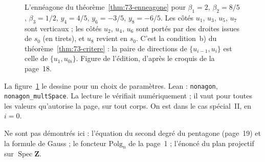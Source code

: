 \begin{figure}[htbp]
\centering
{}
\caption{L'ennéagone du théorème~\ref{thm:73-enneagone} pour $\beta_1 = 2$, $\beta_2 = 8/5$, $\beta_3 = 1/2$, $y_4 = 4/5$, $y_6 = -3/5$, $y_8 = -6/5$. Les côtés $u_1$, $u_3$, $u_5$, $u_7$ sont verticaux ; les côtés $u_2$, $u_4$, $u_6$ sont portés par des droites issues de $s_0$ (en tirets), et $u_8$ revient en $s_0$. C'est la condition~b) du théorème~\ref{thm:73-critere} : la paire de directions de $\{u_{i-1}, u_i\}$ est celle de $\{u_1, u_{0i}\}$. Figure de l'édition, d'après le croquis de la page~18.}
\label{fig:73-enneagone}
\end{figure}

La figure~\ref{fig:73-enneagone} le dessine pour un choix de paramètres. Lean : \texttt{nonagon}, \texttt{nonagon\_multSpace}. La lecture le vérifiait numériquement  ; il vaut pour toutes les valeurs qu'autorise la page, sur tout corps. On est dans le cas spécial~II, en $i = 0$.

Ne sont pas démontrés ici : l'équation du second degré du pentagone (page~19) et la formule de Gauss ; le foncteur $\mathrm{Polg}_n$ de la page~1 ; l'énoncé du plan projectif sur $\operatorname{Spec}\mathbf{Z}$.
